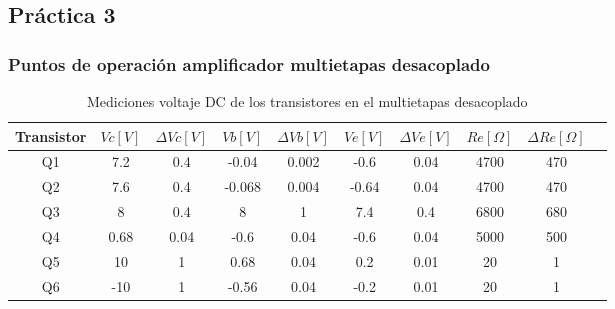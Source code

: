 \subsection{Práctica 3}

\subsubsection{Puntos de operación amplificador multietapas desacoplado}

\begin{table}[h!]
\centering
\begin{tabular}{|c|c|c|c|c|c|c|c|c|c|}
\hline
\textbf{Transistor} & \textbf{\(Vc[V]\)} & \textbf{\(\varDelta Vc[V]\)} & \textbf{\(Vb[V]\)} & \textbf{\(\varDelta Vb[V]\)} & \textbf{\(Ve[V]\)} & \textbf{\(\varDelta Ve[V]\)} & \textbf{\(Re[\Omega]\)} & \textbf{\(\varDelta Re[\Omega]\)} \\ \hline
Q1 & 7.2 & 0.4 & -0.04 & 0.002 & -0.6 & 0.04 & 4700 & 470 \\ \hline
Q2 & 7.6 & 0.4 & -0.068 & 0.004 & -0.64 & 0.04 & 4700 & 470 \\ \hline
Q3 & 8 & 0.4 & 8 & 1 & 7.4 & 0.4 & 6800 & 680 \\ \hline
Q4 & 0.68 & 0.04 & -0.6 & 0.04 & -0.6 & 0.04 & 5000 & 500 \\ \hline
Q5 & 10 & 1 & 0.68 & 0.04 & 0.2 & 0.01 & 20 & 1 \\ \hline
Q6 & -10 & 1 & -0.56 & 0.04 & -0.2 & 0.01 & 20 & 1 \\ \hline
\end{tabular}
\caption{Mediciones voltaje DC de los transistores en el multietapas desacoplado}
\label{tab:med-voltaje-dc-transistores-multietapas-desacoplado}
\end{table}

